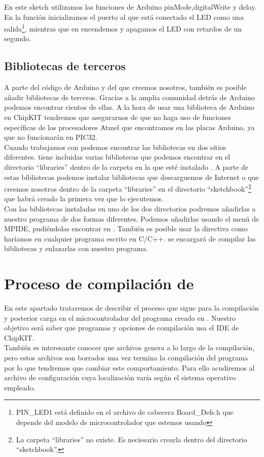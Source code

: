 En este sketch utilizamos las funciones de Arduino pinMode,digitalWrite y delay. En la función  inicializamos el puerto al que está conectado el LED como una salida\protect\footnote{PIN\_LED1 está definido en el archivo de cabecera Board\_Defs.h que depende del modelo de microcontrolador que estemos usando}, mientras que en  encendemos y apagamos el LED con retardos de un segundo.

\subsection{Bibliotecas de terceros}
A parte del código de Arduino y del que creemos nosotros, también es posible añadir bibliotecas de terceros. Gracias a la amplia comunidad detrás de Arduino podemos encontrar cientos de ellas. A la hora de usar una biblioteca de Arduino en ChipKIT tendremos que asegurarnos de que no haga uso de funciones específicas de los procesadores Atmel que encontramos en las placas Arduino, ya que no funcionarán en PIC32.\\
Cuando trabajamos con  podemos encontrar las bibliotecas en dos sitios diferentes.  tiene incluidas varias bibliotecas que podemos encontrar en el directorio ``libraries'' dentro de la carpeta en la que esté instalado . A parte de estas bibliotecas podemos instalar bibliotecas que descarguemos de Internet o que creemos nosotros dentro de la carpeta ``libraries'' en el directorio ``sketchbook''\protect\footnote{La carpeta ``libraries'' no existe. Es neciesario crearla dentro del directorio ``sketchbook''.} que  habrá creado la primera vez que lo ejecutemos.\\
Con las bibliotecas instaladas en uno de los dos directorios podremos añadirlas a nuestro programa de dos formas diferentes. Podemos añadirlas usando el menú de MPIDE, pudiéndolas encontrar en . También es posible usar la directiva  como haríamos en cualquier programa escrito en C/C++.  se encargará de compilar las bibliotecas y enlazarlas con nuestro programa.

\section{Proceso de compilación de }
En este apartado trataremos de describir el proceso que sigue  para la compilación y posterior carga en el microcontrolador del programa creado en . Nuestro objetivo será saber que programas y opciones de compilación usa el IDE de ChipKIT.\\
También es interesante conocer que archivos genera  a lo largo de la compilación, pero estos archivos son borrados una vez termina la compilación del programa por lo que tendremos que cambiar este comportamiento. Para ello acudiremos al archivo de configuración  cuya localización varía según el sistema operativo empleado.

